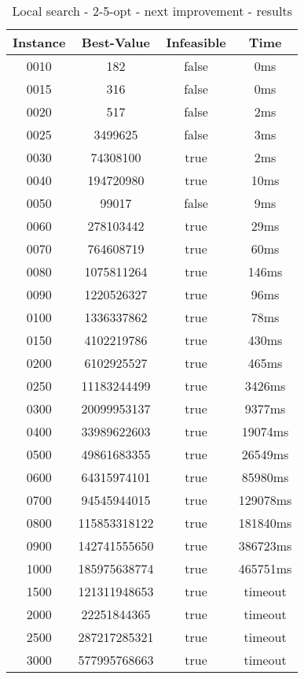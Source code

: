 \begin{table}
\centering
	\begin{tabular}{|| c | c | c | c ||} 
		\hline
		Instance & Best-Value & Infeasible & Time \\
		\hline\hline
0010 & 182 & false & 0ms \\
0015 & 316 & false & 0ms \\
0020 & 517 & false & 2ms \\
0025 & 3499625 & false & 3ms \\
0030 & 74308100 & true & 2ms \\
0040 & 194720980 & true & 10ms \\
0050 & 99017 & false & 9ms \\
0060 & 278103442 & true & 29ms \\
0070 & 764608719 & true & 60ms \\
0080 & 1075811264 & true & 146ms \\
0090 & 1220526327 & true & 96ms \\
0100 & 1336337862 & true & 78ms \\
0150 & 4102219786 & true & 430ms \\
0200 & 6102925527 & true & 465ms \\
0250 & 11183244499 & true & 3426ms \\
0300 & 20099953137 & true & 9377ms \\
0400 & 33989622603 & true & 19074ms \\
0500 & 49861683355 & true & 26549ms \\
0600 & 64315974101 & true & 85980ms \\
0700 & 94545944015 & true & 129078ms \\
0800 & 115853318122 & true & 181840ms \\
0900 & 142741555650 & true & 386723ms \\
1000 & 185975638774 & true & 465751ms \\
1500 & 121311948653 & true & timeout \\
2000 & 22251844365 & true & timeout \\
2500 & 287217285321 & true & timeout \\
3000 & 577995768663 & true & timeout \\
		\hline
	\end{tabular}
\caption{Local search - 2-5-opt - next improvement - results}
\end{table}


